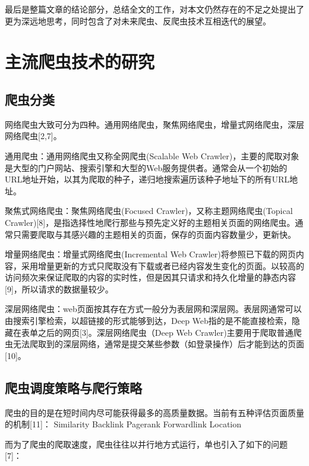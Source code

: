 \documentclass[doctor,privacy,twoside]{buaa_mac}
\begin{document}
最后是整篇文章的结论部分，总结全文的工作，对本文仍然存在的不足之处提出了更为深远地思考，同时包含了对未来爬虫、反爬虫技术互相迭代的展望。






\chapter{主流爬虫技术的研究}

\section{爬虫分类}
网络爬虫大致可分为四种。通用网络爬虫，聚焦网络爬虫，增量式网络爬虫，深层网络爬虫[2,7]。

通用爬虫：通用网络爬虫又称全网爬虫(Scalable Web Crawler)，主要的爬取对象是大型的门户网站、搜索引擎和大型的Web服务提供者。通常会从一个初始的URL地址开始，以其为爬取的种子，递归地搜索遍历该种子地址下的所有URL地址。

聚焦式网络爬虫：聚焦网络爬虫(Focused Crawler)，又称主题网络爬虫(Topical Crawler)[8]，是指选择性地爬行那些与预先定义好的主题相关页面的网络爬虫。通常只需要爬取与其感兴趣的主题相关的页面，保存的页面内容数量少，更新快。

增量网络爬虫：增量式网络爬虫(Incremental Web Crawler)将参照已下载的网页内容，采用增量更新的方式只爬取没有下载或者已经内容发生变化的页面。以较高的访问频次来保证爬取的内容的实时性，但是因其只请求和持久化增量的静态内容[9]，所以请求的数据量较少。

深层网络爬虫：web页面按其存在方式一般分为表层网和深层网。表层网通常可以由搜索引擎检索，以超链接的形式能够到达，Deep Web指的是不能直接检索，隐藏在表单之后的网页[3]。深层网络爬虫（Deep Web Crawler)主要用于爬取普通爬虫无法爬取到的深层网络，通常是提交某些参数（如登录操作）后才能到达的页面[10]。


\section{爬虫调度策略与爬行策略}
爬虫的目的是在短时间内尽可能获得最多的高质量数据。当前有五种评估页面质量的机制[11]：
Similarity 
Backlink 
Pagerank 
Forwardlink 
Location

而为了爬虫的爬取速度，爬虫往往以并行地方式运行，单也引入了如下的问题[7]：
\end{document}
